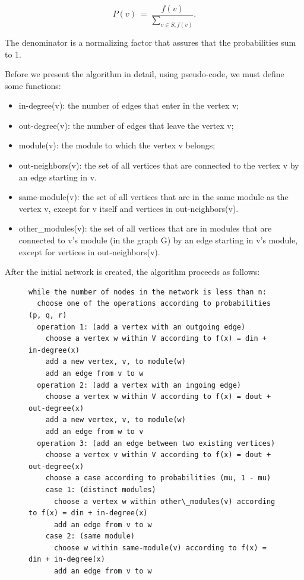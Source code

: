 $$
  P(v) ~=~ \frac{ f(v) }{ \sum_{v \in S, f(v)} }.
$$

The denominator is a normalizing factor that assures that the probabilities sum
to 1.

Before we present the algorithm in detail, using pseudo-code, we must define
some functions:


\begin{itemize}

\item in-degree(v): the number of edges that enter in the vertex v;

\item out-degree(v): the number of edges that leave the vertex v;

\item module(v): the module to which the vertex v belongs;

\item out-neighbors(v): the set of all vertices that are connected to the vertex
v by an edge starting in v.

\item same-module(v): the set of all vertices that are in the same module as the
vertex v, except for v itself and vertices in out-neighbors(v).

\item other\_modules(v): the set of all vertices that are in modules that are
connected to v's module (in the graph G) by an edge starting in v's module,
except for vertices in out-neighbors(v).

\end{itemize}

After the initial network is created, the algorithm proceeds as follows:

\begin{figure}
\begin{verbatim}
while the number of nodes in the network is less than n:
  choose one of the operations according to probabilities (p, q, r)
  operation 1: (add a vertex with an outgoing edge)
    choose a vertex w within V according to f(x) = din + in-degree(x)
    add a new vertex, v, to module(w)
    add an edge from v to w
  operation 2: (add a vertex with an ingoing edge)
    choose a vertex w within V according to f(x) = dout + out-degree(x)
    add a new vertex, v, to module(w)
    add an edge from w to v
  operation 3: (add an edge between two existing vertices)
    choose a vertex v within V according to f(x) = dout + out-degree(x)
    choose a case according to probabilities (mu, 1 - mu)
    case 1: (distinct modules)
  	  choose a vertex w within other\_modules(v) according to f(x) = din + in-degree(x)
      add an edge from v to w
    case 2: (same module)
      choose w within same-module(v) according to f(x) = din + in-degree(x)
      add an edge from v to w
\end{verbatim}
\end{figure}

